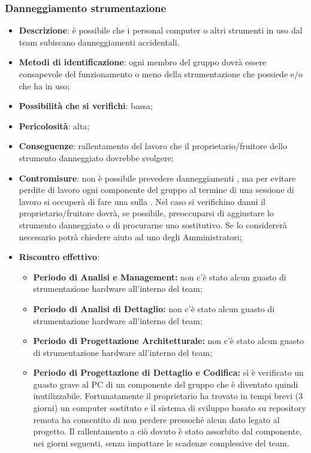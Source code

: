 		\subsubsection{Danneggiamento strumentazione }
			\begin{itemize}
				\item \textbf{Descrizione}: è possibile che i personal computer o altri strumenti in uso dal team subiscano danneggiamenti accidentali.
				\item \textbf{Metodi di identificazione}: ogni membro del gruppo dovrà essere consapevole del funzionamento o meno della strumentazione che possiede e$/$o che ha in uso;
				\item \textbf{Possibilità che si verifichi}: bassa;
				\item \textbf{Pericolosità}: alta;
				\item \textbf{Conseguenze}: rallentamento del lavoro che il proprietario$/$fruitore dello strumento danneggiato dovrebbe svolgere;
				\item \textbf{Contromisure}: non è possibile prevedere danneggiamenti , ma per evitare perdite di lavoro ogni componente del gruppo al termine di una sessione di lavoro si occuperà di fare una  sulla . Nel caso si verifichino danni  il proprietario$/$fruitore dovrà, se possibile, preoccuparsi di aggiustare lo strumento danneggiato o di procurarne uno sostitutivo. Se lo considererà necessario potrà chiedere aiuto ad uno degli Amministratori;
				\item \textbf{Riscontro effettivo}:
				\begin{itemize}
					\item \textbf{Periodo di Analisi e Management:} non c'è stato alcun guasto di strumentazione hardware all'interno del team;
					\item \textbf{Periodo di Analisi di Dettaglio:} non c'è stato alcun guasto di strumentazione hardware all'interno del team;
					\item \textbf{Periodo di Progettazione Architetturale:} non c'è stato alcun guasto di strumentazione hardware all'interno del team;
               \item \textbf{Periodo di Progettazione di Dettaglio e Codifica:} sì è verificato un guasto grave al PC di un componente del gruppo che è diventato quindi inutilizzabile. Fortunatamente il proprietario ha trovato in tempi brevi (3 giorni) un computer sostituto e il sistema di sviluppo basato su repository remota ha consentito di non perdere pressoché alcun dato legato al progetto.
               Il rallentamento a ciò dovuto è stato assorbito dal componente, nei giorni seguenti, senza impattare le scadenze complessive del team.
				\end{itemize}
			\end{itemize}

